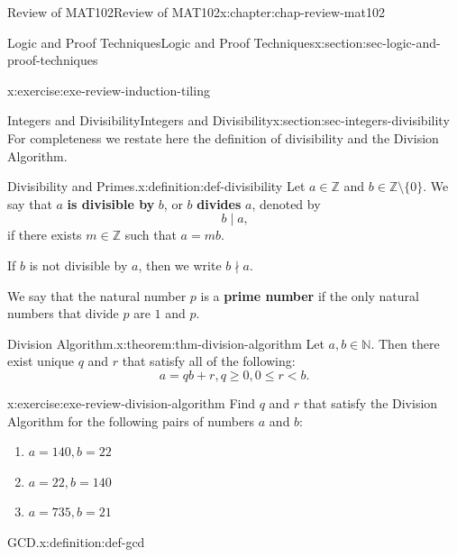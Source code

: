 \documentclass[oneside,10pt,]{book}
\newcommand{\terminology}[1]{\textbf{#1}}
\numberwithin{equation}{section}
\newcommand{\lt}{<}
\begin{document}
\begin{chapterptx}{Review of MAT102}{}{Review of MAT102}{}{}{x:chapter:chap-review-mat102}
\begin{sectionptx}{Logic and Proof Techniques}{}{Logic and Proof Techniques}{}{}{x:section:sec-logic-and-proof-techniques}
\begin{inlineexercise}{}{x:exercise:exe-review-induction-tiling}
\end{inlineexercise}
\end{sectionptx}
%
%
\typeout{************************************************}
\typeout{************************************************}
%
\begin{sectionptx}{Integers and Divisibility}{}{Integers and Divisibility}{}{}{x:section:sec-integers-divisibility}
For completeness we restate here the definition of divisibility and the Division Algorithm.%
\begin{definition}{Divisibility and Primes.}{x:definition:def-divisibility}%
\label{g:notation:id322041}%
Let \(a \in \mathbb{Z}\) and \(b \in \mathbb{Z} \setminus \{0\}\). We say that \(a\) \terminology{is divisible by} \(b\), or \(b\) \terminology{divides} \(a\), denoted by%
\begin{equation*}
b \mid a\text{,}
\end{equation*}
if there exists \(m \in \mathbb{Z}\) such that \(a = mb\).%
\par
If \(b\) is not divisible by \(a\), then we write \(b \nmid a\).%
\par
We say that the natural number \(p\) is a \terminology{prime number} if the only natural numbers that divide \(p\) are \(1\) and \(p\).%
\end{definition}
\begin{theorem}{Division Algorithm.}{}{x:theorem:thm-division-algorithm}%
Let \(a,b \in \mathbb{N}\). Then there exist unique \(q\) and \(r\) that satisfy all of the following:%
\begin{equation*}
a = qb + r, q \geq 0, 0 \leq r \lt b\text{.}
\end{equation*}
%
\end{theorem}
\begin{inlineexercise}{}{x:exercise:exe-review-division-algorithm}%
Find \(q\) and \(r\) that satisfy the Division Algorithm for the following pairs of numbers \(a\) and \(b\):%
\begin{enumerate}[label=(\alph*)]
\item{}\(\displaystyle a = 140, b = 22\)%
\item{}\(\displaystyle a = 22, b = 140\)%
\item{}\(\displaystyle a = 735, b = 21\)%
\end{enumerate}
%
\end{inlineexercise}
\begin{definition}{GCD.}{x:definition:def-gcd}%
\label{g:notation:id322505}%

\end{definition}
\end{sectionptx}
\end{chapterptx}
\end{document}
